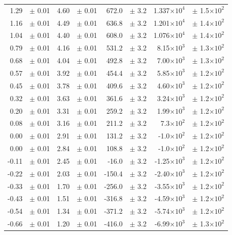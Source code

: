 \documentclass[a4paper]{article}
\begin{document}
\begin{center}
\begin{longtable}[htbp]{rlrlrlrl}
1.29 & $\pm$ 0.01 & 4.60 & $\pm$ 0.01 & 672.0 & $\pm$ 3.2 & 1.337$\times 10^{4}$ & $\pm$ 1.5$\times 10^{2}$ \\ 
1.16 & $\pm$ 0.01 & 4.49 & $\pm$ 0.01 & 636.8 & $\pm$ 3.2 & 1.201$\times 10^{4}$ & $\pm$ 1.4$\times 10^{2}$ \\ 
1.04 & $\pm$ 0.01 & 4.40 & $\pm$ 0.01 & 608.0 & $\pm$ 3.2 & 1.076$\times 10^{4}$ & $\pm$ 1.4$\times 10^{2}$ \\ 
0.79 & $\pm$ 0.01 & 4.16 & $\pm$ 0.01 & 531.2 & $\pm$ 3.2 & 8.15$\times 10^{3}$ & $\pm$ 1.3$\times 10^{2}$ \\ 
0.68 & $\pm$ 0.01 & 4.04 & $\pm$ 0.01 & 492.8 & $\pm$ 3.2 & 7.00$\times 10^{3}$ & $\pm$ 1.3$\times 10^{2}$ \\ 
0.57 & $\pm$ 0.01 & 3.92 & $\pm$ 0.01 & 454.4 & $\pm$ 3.2 & 5.85$\times 10^{3}$ & $\pm$ 1.2$\times 10^{2}$ \\ 
0.45 & $\pm$ 0.01 & 3.78 & $\pm$ 0.01 & 409.6 & $\pm$ 3.2 & 4.60$\times 10^{3}$ & $\pm$ 1.2$\times 10^{2}$ \\ 
0.32 & $\pm$ 0.01 & 3.63 & $\pm$ 0.01 & 361.6 & $\pm$ 3.2 & 3.24$\times 10^{3}$ & $\pm$ 1.2$\times 10^{2}$ \\ 
0.20 & $\pm$ 0.01 & 3.31 & $\pm$ 0.01 & 259.2 & $\pm$ 3.2 & 1.99$\times 10^{3}$ & $\pm$ 1.2$\times 10^{2}$ \\ 
0.08 & $\pm$ 0.01 & 3.16 & $\pm$ 0.01 & 211.2 & $\pm$ 3.2 & 7.3$\times 10^{2}$ & $\pm$ 1.2$\times 10^{2}$ \\ 
0.00 & $\pm$ 0.01 & 2.91 & $\pm$ 0.01 & 131.2 & $\pm$ 3.2 & -1.0$\times 10^{2}$ & $\pm$ 1.2$\times 10^{2}$ \\ 
0.00 & $\pm$ 0.01 & 2.84 & $\pm$ 0.01 & 108.8 & $\pm$ 3.2 & -1.0$\times 10^{2}$ & $\pm$ 1.2$\times 10^{2}$ \\ 
-0.11 & $\pm$ 0.01 & 2.45 & $\pm$ 0.01 & -16.0 & $\pm$ 3.2 & -1.25$\times 10^{3}$ & $\pm$ 1.2$\times 10^{2}$ \\ 
-0.22 & $\pm$ 0.01 & 2.03 & $\pm$ 0.01 & -150.4 & $\pm$ 3.2 & -2.40$\times 10^{3}$ & $\pm$ 1.2$\times 10^{2}$ \\ 
-0.33 & $\pm$ 0.01 & 1.70 & $\pm$ 0.01 & -256.0 & $\pm$ 3.2 & -3.55$\times 10^{3}$ & $\pm$ 1.2$\times 10^{2}$ \\ 
-0.43 & $\pm$ 0.01 & 1.51 & $\pm$ 0.01 & -316.8 & $\pm$ 3.2 & -4.59$\times 10^{3}$ & $\pm$ 1.2$\times 10^{2}$ \\ 
-0.54 & $\pm$ 0.01 & 1.34 & $\pm$ 0.01 & -371.2 & $\pm$ 3.2 & -5.74$\times 10^{3}$ & $\pm$ 1.2$\times 10^{2}$ \\ 
-0.66 & $\pm$ 0.01 & 1.20 & $\pm$ 0.01 & -416.0 & $\pm$ 3.2 & -6.99$\times 10^{3}$ & $\pm$ 1.3$\times 10^{2}$ \\ 

\end{longtable}
\end{center}
\end{document}
